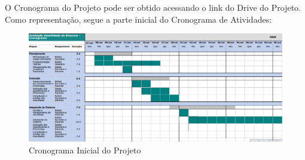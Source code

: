 	O Cronograma do Projeto pode ser obtido acessando o link do Drive do Projeto. Como representação, segue a parte inicial do Cronograma de Atividades:

	\begin{figure}[H]
		\centering
		\includegraphics[width=1\textwidth]{imagens/cronograma}
		\caption{Cronograma Inicial do Projeto}
		\label{img:cronograma}
	\end{figure}

